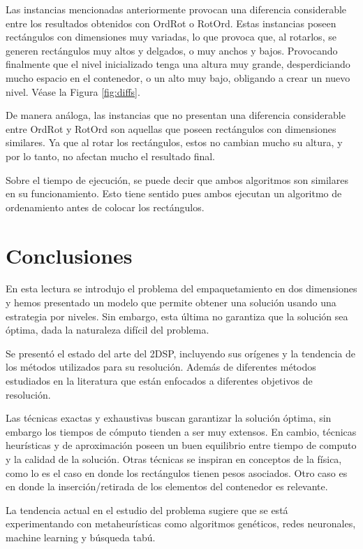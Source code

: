 \documentclass[letter, 10pt]{article}
\begin{document}
Las instancias mencionadas anteriormente provocan una diferencia considerable entre los resultados obtenidos con OrdRot o RotOrd. Estas instancias poseen rectángulos con dimensiones muy variadas, lo que provoca que, al rotarlos, se generen rectángulos muy altos y delgados, o muy anchos y bajos. Provocando finalmente que el nivel inicializado tenga una altura muy grande, desperdiciando mucho espacio en el contenedor, o un alto muy bajo, obligando a crear un nuevo nivel. Véase la Figura \ref{fig:diffs}.

De manera análoga, las instancias que no presentan una diferencia considerable entre OrdRot y RotOrd son aquellas que poseen rectángulos con dimensiones similares. Ya que al rotar los rectángulos, estos no cambian mucho su altura, y por lo tanto, no afectan mucho el resultado final.

Sobre el tiempo de ejecución, se puede decir que ambos algoritmos son similares en su funcionamiento. Esto tiene sentido pues ambos ejecutan un algoritmo de ordenamiento antes de colocar los rectángulos.








\section{Conclusiones}

En esta lectura se introdujo el problema del empaquetamiento en dos dimensiones y hemos presentado un modelo que permite obtener una solución usando una estrategia por niveles. Sin embargo, esta última no garantiza que la solución sea óptima, dada la naturaleza difícil del problema.

Se presentó el estado del arte del 2DSP, incluyendo sus orígenes y la tendencia de los métodos utilizados para su resolución. Además de diferentes métodos estudiados en la literatura que están enfocados a diferentes objetivos de resolución.

Las técnicas exactas y exhaustivas buscan garantizar la solución óptima, sin embargo los tiempos de cómputo tienden a ser muy extensos. En cambio, técnicas heurísticas y de aproximación poseen un buen equilibrio entre tiempo de computo y la calidad de la solución. Otras técnicas se inspiran en conceptos de la física, como lo es el caso en donde los rectángulos tienen pesos asociados. Otro caso es en donde la inserción/retirada de los elementos del contenedor es relevante.

La tendencia actual en el estudio del problema sugiere que se está experimentando con metaheurísticas como algoritmos genéticos, redes neuronales, machine learning y búsqueda tabú.
\end{document}
